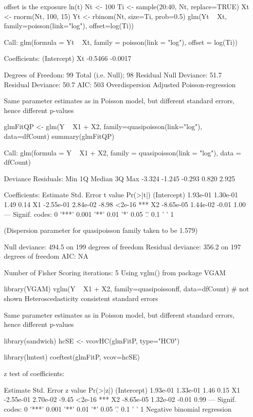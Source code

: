 offset is the exposure ln(t)
Nt   <- 100
Ti   <- sample(20:40, Nt, replace=TRUE)
Xt   <- rnorm(Nt, 100, 15)
Yt   <- rbinom(Nt, size=Ti, prob=0.5)
glm(Yt ~ Xt, family=poisson(link="log"), offset=log(Ti))

Call:  glm(formula = Yt ~ Xt, family = poisson(link = "log"), offset = log(Ti))

Coefficients:
(Intercept)           Xt  
    -0.5466      -0.0017  

Degrees of Freedom: 99 Total (i.e. Null);  98 Residual
Null Deviance:      51.7 
Residual Deviance: 50.7     AIC: 503 
Overdispersion
Adjusted Poisson-regression

Same parameter estimates as in Poisson model, but different standard errors, hence different p-values

glmFitQP <- glm(Y ~ X1 + X2, family=quasipoisson(link="log"), data=dfCount)
summary(glmFitQP)

Call:
glm(formula = Y ~ X1 + X2, family = quasipoisson(link = "log"), 
    data = dfCount)

Deviance Residuals: 
   Min      1Q  Median      3Q     Max  
-3.324  -1.245  -0.293   0.820   2.925  

Coefficients:
             Estimate Std. Error t value Pr(>|t|)    
(Intercept)  1.93e-01   1.30e-01    1.49     0.14    
X1          -2.55e-01   2.84e-02   -8.98   <2e-16 ***
X2          -8.65e-05   1.44e-02   -0.01     1.00    
---
Signif. codes:  0 '***' 0.001 '**' 0.01 '*' 0.05 '.' 0.1 ' ' 1 

(Dispersion parameter for quasipoisson family taken to be 1.579)

    Null deviance: 494.5  on 199  degrees of freedom
Residual deviance: 356.2  on 197  degrees of freedom
AIC: NA

Number of Fisher Scoring iterations: 5
Using vglm() from package VGAM

library(VGAM)
vglm(Y ~ X1 + X2, family=quasipoissonff, data=dfCount)
# not shown
Heteroscedasticity consistent standard errors

Same parameter estimates as in Poisson model, but different standard errors, hence different p-values

library(sandwich)
hcSE <- vcovHC(glmFitP, type="HC0")

library(lmtest)
coeftest(glmFitP, vcov=hcSE)

z test of coefficients:

             Estimate Std. Error z value Pr(>|z|)    
(Intercept)  1.93e-01   1.33e-01    1.46     0.15    
X1          -2.55e-01   2.70e-02   -9.45   <2e-16 ***
X2          -8.65e-05   1.32e-02   -0.01     0.99    
---
Signif. codes:  0 '***' 0.001 '**' 0.01 '*' 0.05 '.' 0.1 ' ' 1 
Negative binomial regression

